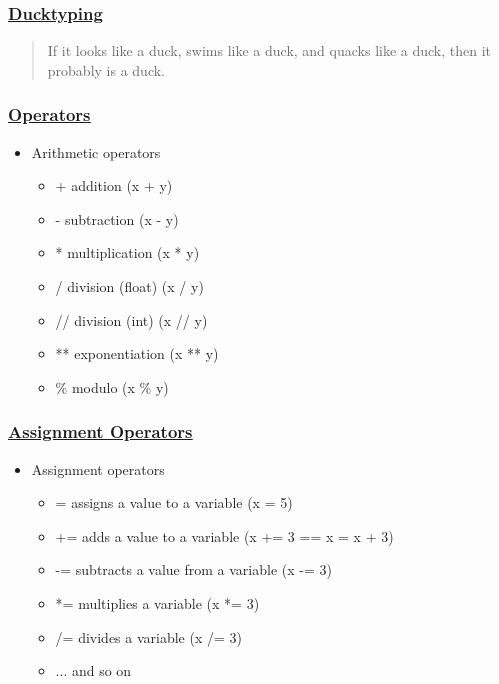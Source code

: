 \documentclass{beamer}
\newcommand{\hrefu}[2]{\underline{\href{#1}{#2}}}
\begin{document}
\begin{frame}
  \frametitle{\hrefu{https://en.wikipedia.org/wiki/Duck_typing}{Ducktyping}}
  \begin{quote}
  If it looks like a duck, swims like a duck, and quacks like a duck, then it probably is a duck.
  \end{quote}
  
  
\end{frame}
\begin{frame}
  \frametitle{\hrefu{https://docs.python.org/3/library/operator.html}{Operators}}
  \begin{itemize}
    \item Arithmetic operators
    \begin{itemize}
      \item + addition (x + y)
      \item - subtraction (x - y)
      \item * multiplication (x * y)
      \item / division (float) (x / y)
      \item // division (int) (x // y)
      \item ** exponentiation (x ** y)
      \item \% modulo (x \% y)
    \end{itemize}
  \end{itemize}
\end{frame}
\begin{frame}
  \frametitle{\hrefu{https://docs.python.org/3/library/operator.html\#in-place-operators}{Assignment Operators}}
  \begin{itemize}
    \item Assignment operators
    \begin{itemize}
      \item = assigns a value to a variable (x = 5)
      \item += adds a value to a variable (x += 3 == x = x + 3)
      \item -= subtracts a value from a variable (x -= 3)
      \item *= multiplies a variable (x *= 3)
      \item /= divides a variable (x /= 3)
      \item ... and so on 
    \end{itemize}
  \end{itemize}
\end{frame}
\end{document}
